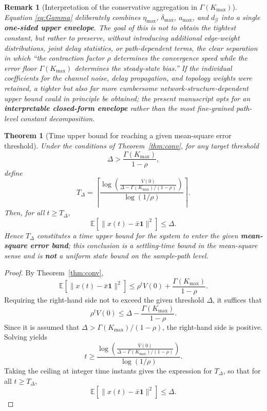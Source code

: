 \documentclass[10pt]{article}
\newtheorem{theorem}{Theorem}[section]
\newtheorem{remark}{Remark}[section]
\newcommand{\amax}{a_{\max}}
\newcommand{\gdeg}{d_{\mathcal{G}}}
\begin{document}
\begin{remark}[Interpretation of the conservative aggregation in $\Gamma(K_{\max})$]
Equation \eqref{eq:Gamma} deliberately combines $\eta_{\max}$, $\delta_{\max}$, $\amax$, and $\gdeg$ into a single \textbf{one-sided upper envelope}. The goal of this is not to obtain the tightest constant, but rather to preserve, without introducing additional edge-weight distributions, joint delay statistics, or path-dependent terms, the clear separation in which ``the contraction factor $\rho$ determines the convergence speed while the error floor $\Gamma(K_{\max})$ determines the steady-state bias.'' If the individual coefficients for the channel noise, delay propagation, and topology weights were retained, a tighter but also far more cumbersome network-structure-dependent upper bound could in principle be obtained; the present manuscript opts for an \textbf{interpretable closed-form envelope} rather than the most fine-grained path-level constant decomposition.
\end{remark}

\begin{theorem}[Time upper bound for reaching a given mean-square error threshold]\label{thm:finite}
  Under the conditions of Theorem~\ref{thm:conv}, for any target threshold
  \[
    \Delta > \frac{\Gamma(K_{\max})}{1-\rho},
  \]
  define
  \begin{equation}
    T_{\Delta}
    =
    \left\lceil
      \frac{
        \log\!\left(
          \frac{V(0)}{\Delta-\Gamma(K_{\max})/(1-\rho)}
        \right)
      }{\log(1/\rho)}
    \right\rceil.
  \end{equation}
  Then, for all $t\geq T_{\Delta}$,
  \[
    \mathbb{E}[\|x(t)-\bar{x}\mathbf{1}\|^2]\leq \Delta.
  \]
  Hence $T_{\Delta}$ constitutes a time upper bound for the system to enter the given \textbf{mean-square error band}; this conclusion is a settling-time bound in the mean-square sense and is \textbf{not} a uniform state bound on the sample-path level.
\end{theorem}

\begin{proof}
By Theorem~\ref{thm:conv},
\[
  \mathbb{E}[\|x(t)-\bar{x}\mathbf{1}\|^2]
  \leq
  \rho^t V(0)+\frac{\Gamma(K_{\max})}{1-\rho}.
\]
Requiring the right-hand side not to exceed the given threshold $\Delta$, it suffices that
\[
  \rho^t V(0)\leq \Delta-\frac{\Gamma(K_{\max})}{1-\rho}.
\]
Since it is assumed that $\Delta>\Gamma(K_{\max})/(1-\rho)$, the right-hand side is positive. Solving yields
\[
  t \geq
  \frac{
    \log\!\left(
      \frac{V(0)}{\Delta-\Gamma(K_{\max})/(1-\rho)}
    \right)
  }{\log(1/\rho)}.
\]
Taking the ceiling at integer time instants gives the expression for $T_{\Delta}$, so that for all $t\geq T_{\Delta}$,
\[
  \mathbb{E}[\|x(t)-\bar{x}\mathbf{1}\|^2]\leq \Delta.
\]
\end{proof}
\end{document}
